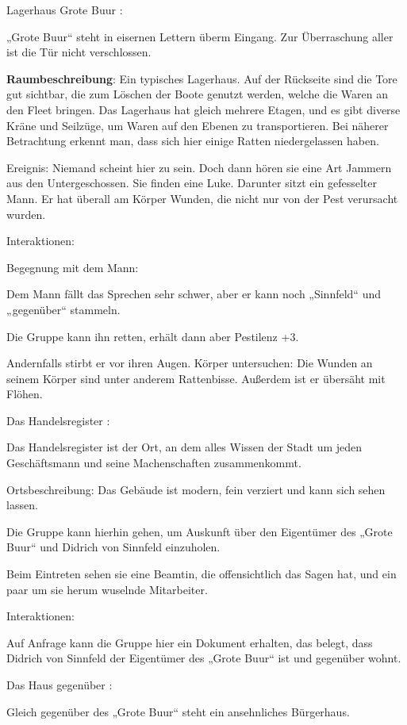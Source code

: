 Lagerhaus Grote Buur
:

„Grote Buur“ steht in eisernen Lettern überm Eingang. Zur Überraschung aller ist die Tür nicht verschlossen.

\textbf{Raumbeschreibung}: Ein typisches Lagerhaus. Auf der Rückseite sind die Tore gut sichtbar, die zum Löschen der Boote genutzt werden, welche die Waren an den Fleet bringen. Das Lagerhaus hat gleich mehrere Etagen, und es gibt diverse Kräne und Seilzüge, um Waren auf den Ebenen zu transportieren. Bei näherer Betrachtung erkennt man, dass sich hier einige Ratten niedergelassen haben.

Ereignis: Niemand scheint hier zu sein. Doch dann hören sie eine Art Jammern aus den Untergeschossen. Sie finden eine Luke. Darunter sitzt ein gefesselter Mann. Er hat überall am Körper Wunden, die nicht nur von der Pest verursacht wurden.

Interaktionen:

Begegnung mit dem Mann:

Dem Mann fällt das Sprechen sehr schwer, aber er kann noch „Sinnfeld“ und „gegenüber“ stammeln.

Die Gruppe kann ihn retten, erhält dann aber Pestilenz +3.

Andernfalls stirbt er vor ihren Augen.
Körper untersuchen: Die Wunden an seinem Körper sind unter anderem Rattenbisse. Außerdem ist er übersäht mit Flöhen.

Das Handelsregister
:

Das Handelsregister ist der Ort, an dem alles Wissen der Stadt um jeden Geschäftsmann und seine Machenschaften zusammenkommt.

Ortsbeschreibung: Das Gebäude ist modern, fein verziert und kann sich sehen lassen.

Die Gruppe kann hierhin gehen, um Auskunft über den Eigentümer des „Grote Buur“ und Didrich von Sinnfeld einzuholen.

Beim Eintreten sehen sie eine Beamtin, die offensichtlich das Sagen hat, und ein paar um sie herum wuselnde Mitarbeiter.

Interaktionen:

Auf Anfrage kann die Gruppe hier ein Dokument erhalten, das belegt, dass Didrich von Sinnfeld der Eigentümer des „Grote Buur“ ist und gegenüber wohnt.

Das Haus gegenüber
:

Gleich gegenüber des „Grote Buur“ steht ein ansehnliches Bürgerhaus.

